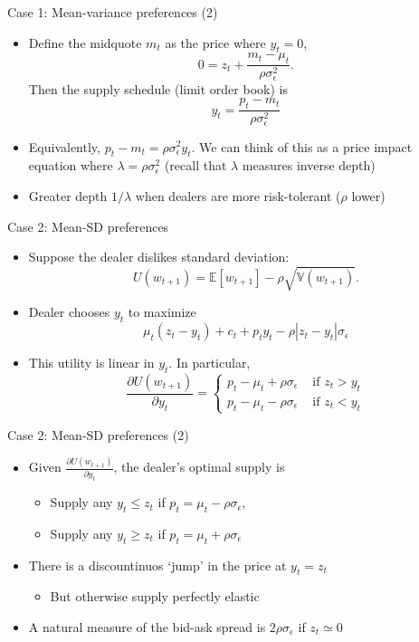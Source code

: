 \documentclass[english,10pt]{beamer}
\begin{document}
\begin{frame}{Case 1: Mean-variance preferences (2)}
	\begin{itemize}
		\item Define the midquote $m_t$ as the price where $y_t=0$,
		\[
		0 = z_t + \frac{m_t-\mu_t}{\rho \sigma^2_\epsilon}.
		\]
		Then the supply schedule (limit order book) is 
		\[
		y_t = \frac{p_t - m_t}{\rho \sigma^2_\epsilon}
		\]
		\item Equivalently, $p_t-m_t=\rho \sigma^2_\epsilon y_t$. We can think of this as a price impact equation where $\lambda=\rho \sigma^2_\epsilon$ (recall that $\lambda$ measures inverse depth)
		\item Greater depth $1/\lambda$ when dealers are more risk-tolerant ($\rho$ lower)
	\end{itemize}
\end{frame}


\begin{frame}{Case 2: Mean-SD preferences}
	\begin{itemize}
		\item Suppose the dealer dislikes standard deviation:
		\[
		U(w_{t+1})=\mathbb{E}[w_{t+1}] - \rho \sqrt{\mathbb{V}(w_{t+1})}.
		\]
		\item Dealer chooses $y_t$ to maximize
		\[
		\mu_t (z_t - y_t) + c_t + p_t y_t - \rho |z_t - y_t|\sigma_\epsilon
		\]
		\item This utility is linear in $y_t$. In particular,
		\[
		\frac{\partial U(w_{t+1})}{\partial y_t}= \left\{
		\begin{aligned}
		p_t-\mu_t+\rho\sigma_{\epsilon}	& \text{ if } z_t>y_t \\
		p_t-\mu_t-\rho\sigma_{\epsilon}	& \text{ if } z_t<y_t 
		\end{aligned}
		\right.
		\]
	\end{itemize}
\end{frame}


\begin{frame}{Case 2: Mean-SD preferences (2)}
	\begin{itemize}
		\item Given $\frac{\partial U(w_{t+1})}{\partial y_t}$, the dealer's optimal supply is
		\begin{itemize}
			\item Supply any $y_t \leq z_t$ if $p_t = \mu_t - \rho\sigma_{\epsilon}$,
			\item Supply any $y_t \geq z_t$ if $p_t = \mu_t + \rho\sigma_{\epsilon}$
		\end{itemize}
		\item There is a discountinuos `jump' in the price at $y_t=z_t$
		\begin{itemize}
			\item But otherwise supply perfectly elastic
		\end{itemize}
		\item A natural measure of the bid-ask spread is $2\rho\sigma_{\epsilon}$ if $z_t \simeq 0$
	\end{itemize}
\end{frame}
\end{document}
